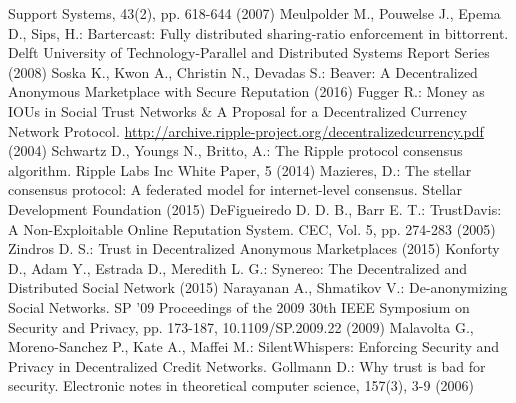 \begin{thebibliography}{40}
  Support Systems, 43(2), pp. 618-644 (2007)
  Meulpolder M., Pouwelse J., Epema D., Sips, H.: Bartercast: Fully distributed sharing-ratio enforcement in bittorrent.
  Delft University of Technology-Parallel and Distributed Systems Report Series (2008)
  Soska K., Kwon A., Christin N., Devadas S.: Beaver: A Decentralized Anonymous Marketplace with Secure Reputation (2016)
  Fugger R.: Money as IOUs in Social Trust Networks \& A Proposal for a Decentralized Currency Network Protocol.
  \url{http://archive.ripple-project.org/decentralizedcurrency.pdf} (2004)
  Schwartz D., Youngs N., Britto, A.: The Ripple protocol consensus algorithm. Ripple Labs Inc White Paper, 5 (2014)
  Mazieres, D.: The stellar consensus protocol: A federated model for internet-level consensus. Stellar Development
  Foundation (2015)
  DeFigueiredo D. D. B., Barr E. T.: TrustDavis: A Non-Exploitable Online Reputation System. CEC, Vol. 5, pp. 274-283
  (2005)
  Zindros D. S.: Trust in Decentralized Anonymous Marketplaces (2015)
  Konforty D., Adam Y., Estrada D., Meredith L. G.: Synereo: The Decentralized and Distributed Social Network (2015)
  Narayanan A., Shmatikov V.: De-anonymizing Social Networks. SP '09 Proceedings of the 2009 30th IEEE Symposium on
  Security and Privacy, pp. 173-187, 10.1109/SP.2009.22 (2009)
  Malavolta G., Moreno-Sanchez P., Kate A.,  Maffei M.: SilentWhispers: Enforcing Security and Privacy in Decentralized
  Credit Networks.
  Gollmann D.: Why trust is bad for security. Electronic notes in theoretical computer science, 157(3), 3-9 (2006)
\end{thebibliography}

